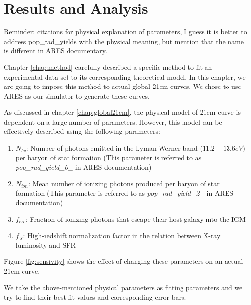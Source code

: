 \documentclass[12pt, TexShade, letterpaper]{report}
\begin{document}
\chapter{Results and Analysis}
\label{chap:results}
Reminder: citations for physical explanation of parameters, I guess it is better to address pop\_rad\_yields with the physical meaning, but mention that the name is different in ARES documentary.\par
Chapter \ref{chap:method} carefully described a specific method to fit an experimental data set to its corresponding theoretical model. In this chapter, we are going to impose this method to actual global 21cm curves. We chose to use ARES as our simulator to generate these curves. \par
As discussed in chapter \ref{chap:global21cm}, the physical model of 21cm curve is dependent on a large number of parameters. However, this model can be effectively described using the following parameters:
\begin{enumerate}
    \item \textbf{$N_{lw}$}: Number of photons emitted in the Lyman-Werner band ($11.2-13.6eV$) per baryon of star formation (This parameter is referred to as \emph{pop\_rad\_yield\_0\_} in ARES documentation)
    \item \textbf{$N_{ion}$}: Mean number of ionizing photons produced per baryon of star formation (This parameter is referred to as \emph{pop\_rad\_yield\_2\_} in ARES documentation)
    \item \textbf{$f_{esc}$}: Fraction of ionizing photons that escape their host galaxy into the IGM
    \item \textbf{$f_X$}: High-redshift normalization factor in the relation between X-ray luminosity and SFR
\end{enumerate}
Figure \ref{fig:sensivity} shows the effect of changing these parameters on an actual 21cm curve.\par

We take the above-mentioned physical parameters as fitting parameters and we try to find their best-fit values and corresponding error-bars.\par
\end{document}
